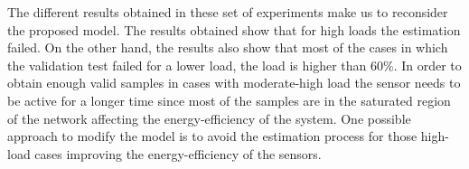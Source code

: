 
The different results obtained in these set of experiments make us to reconsider the proposed model. The results obtained show that for high loads the estimation failed. On the other hand, the results also show that most of the cases in which the validation test failed for a lower load, the load is higher than 60\%. In order to obtain enough valid samples in cases with moderate-high load the sensor needs to be active for a longer time since most of the samples are in the saturated region of the network affecting the energy-efficiency of the system. One possible approach to modify the model is to avoid the estimation process for those high-load cases improving the energy-efficiency of the sensors.
